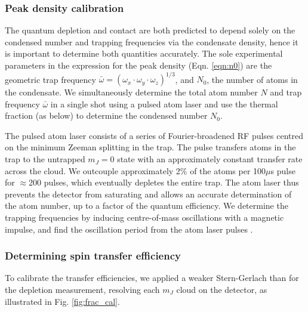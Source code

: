 \subsubsection{Peak density calibration}

    The quantum depletion and contact are both predicted to depend solely on the condensed number and trapping frequencies via the condensate density, hence it is important to determine both quantities accurately. 
    The sole experimental parameters in the expression for the peak density (Eqn. \ref{eqn:n0}) are the geometric trap frequency $\bar{\omega} = \left(\omega_x\cdot\omega_y\cdot\omega_z\right)^{1/3}$, and $N_0$, the number of atoms in the condensate. 
    We simultaneously determine the total atom number $N$ and trap frequency $\bar{\omega}$ in a single shot using a pulsed atom laser and use the thermal fraction (as below) to determine the condensed number $N_0$. 

	The pulsed atom laser consists of a series of Fourier-broadened RF pulses centred on the minimum Zeeman splitting in the trap. 
	The pulse transfers atoms in the trap to the untrapped $m_J=0$ state with an approximately constant transfer rate across the cloud. 
	We outcouple approximately 2\% of the atoms per 100$\mu$s pulse for $\approx$200 pulses, which eventually depletes the entire trap. 
	The atom laser thus prevents the detector from saturating and allows an accurate determination of the atom number, up to a factor of the quantum efficiency. 
	We determine the trapping frequencies by inducing centre-of-mass oscillations with a magnetic impulse, and find the oscillation period from the atom laser pulses \cite{henson18ML}.


\subsubsection{Determining spin transfer efficiency}

	To calibrate the transfer efficiencies, we applied a weaker Stern-Gerlach than for the depletion measurement, resolving each $m_J$ cloud on the detector, as illustrated in Fig. \ref{fig:frac_cal}. 

